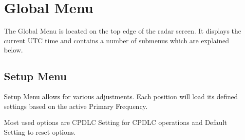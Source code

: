 \documentclass[a4paper,oneside,11pt]{memoir}
\begin{document}
\section{Global Menu}
\label{menu:global}

The Global Menu is located on the top edge of the radar screen. It displays the current UTC time and contains a number of submenus which are explained below.

\subsection{Setup Menu}
\label{menu:set}

Setup Menu allows for various adjustments. Each position will load its defined settings based on the active Primary Frequency.

Most used options are CPDLC Setting for CPDLC operations and Default Setting to reset options.
\end{document}
